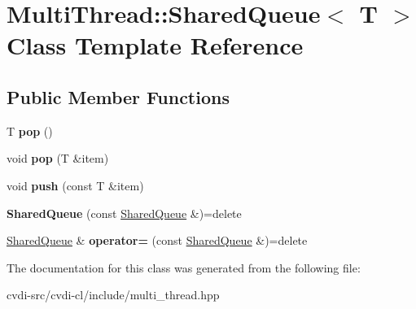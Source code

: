 \hypertarget{classMultiThread_1_1SharedQueue}{}\section{Multi\+Thread\+:\+:Shared\+Queue$<$ T $>$ Class Template Reference}
\label{classMultiThread_1_1SharedQueue}
\subsection*{Public Member Functions}
\begin{DoxyCompactItemize}
\item 
T {\bfseries pop} ()\hypertarget{classMultiThread_1_1SharedQueue_a36f4fcdf32dfc9539cdb0f3063c6f23b}{}\label{classMultiThread_1_1SharedQueue_a36f4fcdf32dfc9539cdb0f3063c6f23b}

\item 
void {\bfseries pop} (T \&item)\hypertarget{classMultiThread_1_1SharedQueue_aa7c25303c0e03b7538c7c3943cdec3ae}{}\label{classMultiThread_1_1SharedQueue_aa7c25303c0e03b7538c7c3943cdec3ae}

\item 
void {\bfseries push} (const T \&item)\hypertarget{classMultiThread_1_1SharedQueue_a9679f3202c59d5cc645bb2dca4a40962}{}\label{classMultiThread_1_1SharedQueue_a9679f3202c59d5cc645bb2dca4a40962}

\item 
{\bfseries Shared\+Queue} (const \hyperlink{classMultiThread_1_1SharedQueue}{Shared\+Queue} \&)=delete\hypertarget{classMultiThread_1_1SharedQueue_ad93bc33944ebd48c36e68a04a406e8a7}{}\label{classMultiThread_1_1SharedQueue_ad93bc33944ebd48c36e68a04a406e8a7}

\item 
\hyperlink{classMultiThread_1_1SharedQueue}{Shared\+Queue} \& {\bfseries operator=} (const \hyperlink{classMultiThread_1_1SharedQueue}{Shared\+Queue} \&)=delete\hypertarget{classMultiThread_1_1SharedQueue_acda51e37bb05b2003fcfe69637dbbe3b}{}\label{classMultiThread_1_1SharedQueue_acda51e37bb05b2003fcfe69637dbbe3b}

\end{DoxyCompactItemize}


The documentation for this class was generated from the following file\+:\begin{DoxyCompactItemize}
\item 
cvdi-\/src/cvdi-\/cl/include/multi\+\_\+thread.\+hpp\end{DoxyCompactItemize}
